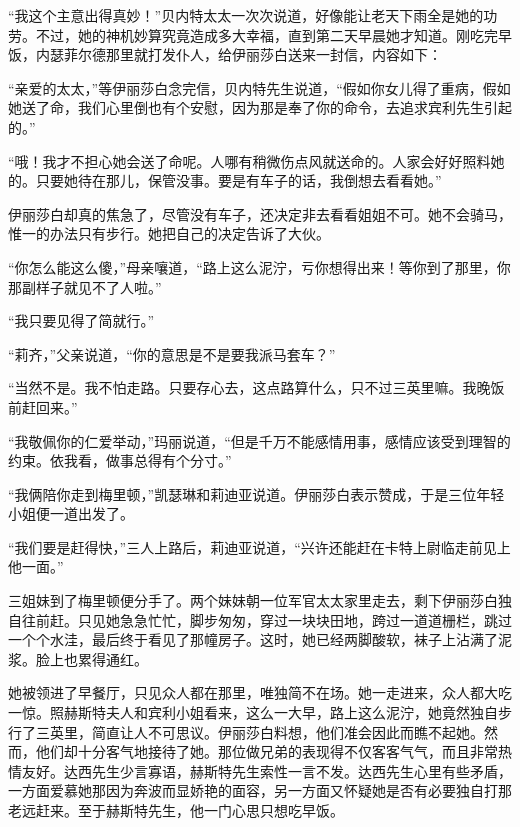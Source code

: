 \par “我这个主意出得真妙！”贝内特太太一次次说道，好像能让老天下雨全是她的功劳。不过，她的神机妙算究竟造成多大幸福，直到第二天早晨她才知道。刚吃完早饭，内瑟菲尔德那里就打发仆人，给伊丽莎白送来一封信，内容如下：
\par “亲爱的太太，”等伊丽莎白念完信，贝内特先生说道，“假如你女儿得了重病，假如她送了命，我们心里倒也有个安慰，因为那是奉了你的命令，去追求宾利先生引起的。”
\par “哦！我才不担心她会送了命呢。人哪有稍微伤点风就送命的。人家会好好照料她的。只要她待在那儿，保管没事。要是有车子的话，我倒想去看看她。”
\par 伊丽莎白却真的焦急了，尽管没有车子，还决定非去看看姐姐不可。她不会骑马，惟一的办法只有步行。她把自己的决定告诉了大伙。
\par “你怎么能这么傻，”母亲嚷道，“路上这么泥泞，亏你想得出来！等你到了那里，你那副样子就见不了人啦。”
\par “我只要见得了简就行。”
\par “莉齐，”父亲说道，“你的意思是不是要我派马套车？”
\par “当然不是。我不怕走路。只要存心去，这点路算什么，只不过三英里嘛。我晚饭前赶回来。”
\par “我敬佩你的仁爱举动，”玛丽说道，“但是千万不能感情用事，感情应该受到理智的约束。依我看，做事总得有个分寸。”
\par “我俩陪你走到梅里顿，”凯瑟琳和莉迪亚说道。伊丽莎白表示赞成，于是三位年轻小姐便一道出发了。
\par “我们要是赶得快，”三人上路后，莉迪亚说道，“兴许还能赶在卡特上尉临走前见上他一面。”
\par 三姐妹到了梅里顿便分手了。两个妹妹朝一位军官太太家里走去，剩下伊丽莎白独自往前赶。只见她急急忙忙，脚步匆匆，穿过一块块田地，跨过一道道栅栏，跳过一个个水洼，最后终于看见了那幢房子。这时，她已经两脚酸软，袜子上沾满了泥浆。脸上也累得通红。
\par 她被领进了早餐厅，只见众人都在那里，唯独简不在场。她一走进来，众人都大吃一惊。照赫斯特夫人和宾利小姐看来，这么一大早，路上这么泥泞，她竟然独自步行了三英里，简直让人不可思议。伊丽莎白料想，他们准会因此而瞧不起她。然而，他们却十分客气地接待了她。那位做兄弟的表现得不仅客客气气，而且非常热情友好。达西先生少言寡语，赫斯特先生索性一言不发。达西先生心里有些矛盾，一方面爱慕她那因为奔波而显娇艳的面容，另一方面又怀疑她是否有必要独自打那老远赶来。至于赫斯特先生，他一门心思只想吃早饭。
